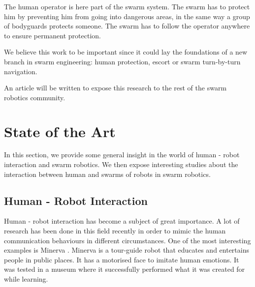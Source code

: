\documentclass[oneside, a4paper, 12pt]{memoir}
\begin{document}
	The human operator is here part of the swarm system. The swarm has to protect him by preventing him from going into dangerous areas, in the same way a group of bodyguards protects someone. The swarm has to follow the operator anywhere to ensure permanent protection.
	
	We believe this work to be important since it could lay the foundations of a new branch in swarm engineering: human protection, escort or swarm turn-by-turn navigation.
	
	An article will be written to expose this research to the rest of the swarm robotics community.

\chapter{State of the Art}
	\label{chap:state_of_the_art}
	In this section, we provide some general insight in the world of human - robot interaction and swarm robotics. We then expose interesting studies about the interaction between human and swarms of robots in swarm robotics.
	
	\section{Human - Robot Interaction}

		
		Human - robot interaction has become a subject of great importance. A lot of research has been done in this field recently in order to mimic the human communication behaviours in different circumstances. One of the most interesting examples is Minerva \citep{thrun1999minerva}. Minerva is a tour-guide robot that educates and entertains people in public places. It has a motorised face to imitate human emotions. It was tested in a museum where it successfully performed what it was created for while learning.
		
\end{document}
